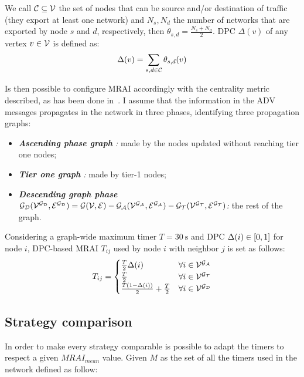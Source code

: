 We call $\mathcal{C} \subseteq \mathcal{V}$ the set of nodes that can be source
and/or destination of traffic (they export at least one network)
and $N_s, N_d$ the number of networks that are exported by node $s$ and $d$,
respectively, then $\theta_{s,d} = \frac{N_s + N_d}{2}$. \ac{DPC} $\Delta(v)$ of
any vertex $v\in \mathcal{V}$ is defined as:
\begin{equation}
		\Delta(v) = \sum_{s,d\in \mathcal{C}} \theta_{s,d} (v)
		\label{eq:dpcv}
\end{equation}

Is then possible to configure \ac{MRAI} accordingly with the centrality metric
described, as has been done in~\cite{milani2020improving}.
I assume that the information in the \ac{ADV} messages propagates in the network
in three phases, identifying three propagation graphs:
\begin{itemize}
    \item \textit{\textbf{Ascending phase graph \ascentgraph}:} made by the
        nodes updated without reaching tier one nodes;
    \item \textit{\textbf{Tier one graph \tiergraph}:} made by tier-1 nodes;
    \item \textit{\textbf{Descending graph phase $\mathcal{\mathcal{G_{D}}(\mathcal{V^{\mathcal{G_{D}}}},\mathcal{E^{\mathcal{G_{D}}}})} = \mathcal{G(\mathcal{V},\mathcal{E})} - \mathcal{\mathcal{G_{A}}(\mathcal{V^{\mathcal{G_{A}}}},\mathcal{E^{\mathcal{G_{A}}}})} - \mathcal{\mathcal{G_{T}}(\mathcal{V^{\mathcal{G_{T}}}},\mathcal{E^{\mathcal{G_{T}}}})}$}:}
        the rest of the graph.
\end{itemize}

Considering a graph-wide maximum timer $T=\SI{30}{\second}$ and \ac{DPC}
$\Delta(i) \in [0,1]$ for node $i$, DPC-based \ac{MRAI} $T_{ij}$ used by node $i$
with neighbor $j$ is set as follows:
\begin{equation} \label{eq:dpc}
    T_{ij}=
    \begin{cases}
        \frac{T}{2}\Delta(i) & \forall i\in \mathcal{V^{\mathcal{G_{A}}}}  \\
    \frac{T}{2} & \forall i\in \mathcal{V^{\mathcal{G_{T}}}} \\
        \frac{T(1-\Delta(i))}{2}+\frac{T}{2} & \forall i\in \mathcal{V^{\mathcal{G_{D}}}}\\
    \end{cases}
\end{equation}

\subsection{Strategy comparison}
\label{subsec:bgp_mrai_strategy_comparison}

In order to make every strategy comparable is possible to adapt the timers to
respect a given $MRAI_{mean}$ value.
Given $M$ as the set of all the timers used in the network defined as follow:

